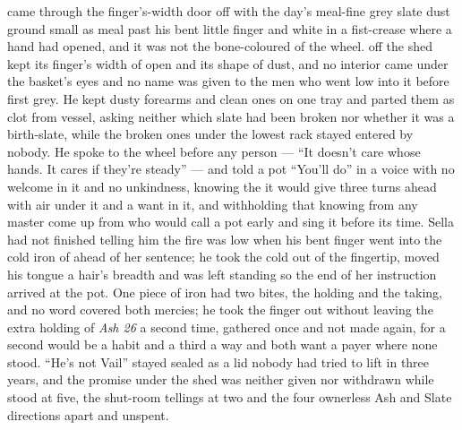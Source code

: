  came through the finger's-width door off  with the day's meal-fine grey slate dust ground small as meal past his bent little finger and white in a fist-crease where a hand had opened, and it was not the bone-coloured  of the wheel.  off the shed kept its finger's width of open and its shape of dust, and no interior came under the basket's eyes and no name was given to the men who went low into it before first grey. He kept dusty forearms and clean ones on one tray and parted them as clot from vessel, asking neither which slate had been broken nor whether it was a birth-slate, while the broken ones under the lowest rack stayed entered by nobody. He spoke to the wheel before any person --- “It doesn't care whose hands. It cares if they're steady” --- and told a pot “You'll do” in a voice with no welcome in it and no unkindness, knowing the  it would give three turns ahead with air under it and a want in it, and withholding that knowing from any master come up from  who would call a pot early and sing it before its time. Sella had not finished telling him the fire was low when his bent finger went into the cold iron of  ahead of her sentence; he took the cold out of the fingertip, moved his tongue a hair's breadth and was left standing so the end of her instruction arrived at the pot. One piece of iron had two bites, the holding and the taking, and no  word covered both mercies; he took the finger out without leaving the extra holding of \emph{Ash 26} a second time, gathered once and not made again, for a second would be a habit and a third a way and both want a payer where none stood. “He's not Vail” stayed sealed as a lid nobody had tried to lift in three years, and the promise under the shed was neither given nor withdrawn while  stood at five, the shut-room tellings at two and the four ownerless Ash and Slate directions apart and unspent.

